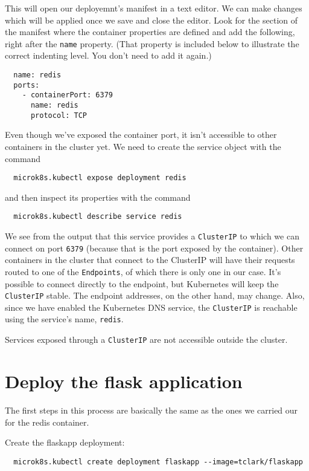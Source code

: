 \documentclass{article}
\begin{document}
This will open our deployemnt's manifest in a text editor. We can make changes which will be applied once we save and close the editor. Look for the section of the manifest where the container properties are defined and add the following, right after the \texttt{name} property. (That property is included below to illustrate the correct indenting level. You don't need to add it again.)

\begin{verbatim}
  name: redis
  ports:
    - containerPort: 6379
      name: redis
      protocol: TCP
\end{verbatim}

Even though we've exposed the container port, it isn't accessible to other containers in the cluster yet. We need to create the service object with the command

\begin{verbatim}
  microk8s.kubectl expose deployment redis
\end{verbatim}

and then inspect its properties with the command 

\begin{verbatim}
  microk8s.kubectl describe service redis
\end{verbatim}

We see from the output that this service provides a \texttt{ClusterIP} to which we can connect on port \texttt{6379} (because that is the port exposed by the container). Other containers in the cluster that connect to the ClusterIP will have their requests routed to one of the \texttt{Endpoints}, of which there is only one in our case. It's possible to connect directly to the endpoint, but Kubernetes will keep the \texttt{ClusterIP} stable. The endpoint addresses, on the other hand, may change. Also, since we have enabled the Kubernetes DNS service, the \texttt{ClusterIP} is reachable using the service's name, \texttt{redis}.

Services exposed through a \texttt{ClusterIP} are not accessible outside the cluster.

\section{Deploy the flask application}
The first steps in this process are basically the same as the ones we carried our for the redis container.

Create the flaskapp deployment:
\begin{verbatim}
  microk8s.kubectl create deployment flaskapp --image=tclark/flaskapp
\end{verbatim}
\end{document}
